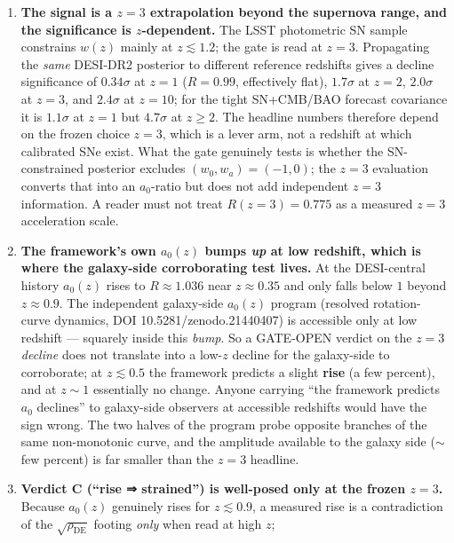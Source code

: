 \documentclass[
]{article}
\begin{document}
\begin{enumerate}
\def\labelenumi{\arabic{enumi}.}
\item
  \textbf{The signal is a \(z=3\) extrapolation beyond the supernova
  range, and the significance is \(z\)-dependent.} The LSST photometric
  SN sample constrains \(w(z)\) mainly at \(z\lesssim1.2\); the gate is
  read at \(z=3\). Propagating the \emph{same} DESI-DR2 posterior to
  different reference redshifts gives a decline significance of
  \(0.34\sigma\) at \(z=1\) (\(R=0.99\), effectively flat),
  \(1.7\sigma\) at \(z=2\), \(2.0\sigma\) at \(z=3\), and \(2.4\sigma\)
  at \(z=10\); for the tight SN+CMB/BAO forecast covariance it is
  \(1.1\sigma\) at \(z=1\) but \(4.7\sigma\) at \(z\ge2\). The headline
  numbers therefore depend on the frozen choice \(z=3\), which is a
  lever arm, not a redshift at which calibrated SNe exist. What the gate
  genuinely tests is whether the SN-constrained posterior excludes
  \((w_0,w_a)=(-1,0)\); the \(z=3\) evaluation converts that into an
  \(a_0\)-ratio but does not add independent \(z=3\) information. A
  reader must not treat \(R(z{=}3)=0.775\) as a measured \(z=3\)
  acceleration scale.
\item
  \textbf{The framework's own \(a_0(z)\) bumps \emph{up} at low
  redshift, which is where the galaxy-side corroborating test lives.} At
  the DESI-central history \(a_0(z)\) rises to \(R\approx1.036\) near
  \(z\approx0.35\) and only falls below \(1\) beyond \(z\approx0.9\).
  The independent galaxy-side \(a_0(z)\) program (resolved
  rotation-curve dynamics, DOI 10.5281/zenodo.21440407) is accessible
  only at low redshift --- squarely inside this \emph{bump}. So a
  GATE-OPEN verdict on the \(z=3\) \emph{decline} does not translate
  into a low-\(z\) decline for the galaxy-side to corroborate; at
  \(z\lesssim0.5\) the framework predicts a slight \textbf{rise} (a few
  percent), and at \(z\sim1\) essentially no change. Anyone carrying
  ``the framework predicts \(a_0\) declines'' to galaxy-side observers
  at accessible redshifts would have the sign wrong. The two halves of
  the program probe opposite branches of the same non-monotonic curve,
  and the amplitude available to the galaxy side (\(\sim\)few percent)
  is far smaller than the \(z=3\) headline.
\item
  \textbf{Verdict C (``rise ⇒ strained'') is well-posed only at the
  frozen \(z=3\).} Because \(a_0(z)\) genuinely rises for
  \(z\lesssim0.9\), a measured rise is a contradiction of the
  \(\sqrt{\rho_\mathrm{DE}}\) footing \emph{only} when read at high \(z\);

\end{enumerate}
\end{document}
